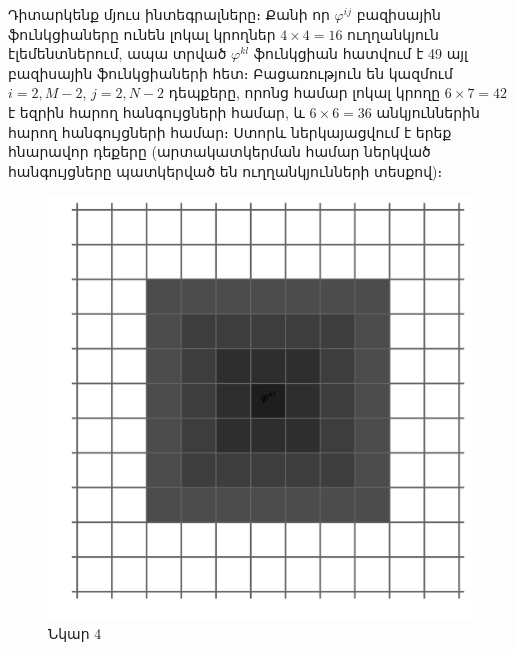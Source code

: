 \documentclass[fleqn, bachelor,subf,12pt,notitlepage]{disser}
\begin{document}
Դիտարկենք մյուս ինտեգրալները։ Քանի որ $\varphi^{ij}$ բազիսային ֆունկցիաները ունեն լոկալ կրողներ $4 \times 4 = 16$ ուղղանկյուն էլեմենտներում, ապա տրված $\varphi^{kl}$ ֆունկցիան հատվում է 49 այլ բազիսային ֆունկցիաների հետ։ Բացառություն են կազմում $i=2, M-2$, $j=2, N-2$ դեպքերը, որոնց համար լոկալ կրողը $6 \times 7 = 42$ է եզրին հարող հանգույցների համար, և $6 \times 6 = 36$ անկյուններին հարող հանգույցների համար։ Ստորև ներկայացվում է երեք հնարավոր դեքերը (արտակատկերման համար ներկված հանգույցները պատկերված են ուղղանկյունների տեսքով)։

\begin{figure}[h!]
  \centering
  \begin{minipage}[b]{0.2\textwidth}
    \includegraphics[width=\textwidth]{images/two_dimensional_basis_intersection}
    \captionsetup{labelformat=empty}
    \caption{Նկար 4}
  \end{minipage}
  \hfill
  \begin{minipage}[b]{0.2\textwidth}

\end{minipage}
\end{figure}
\end{document}
